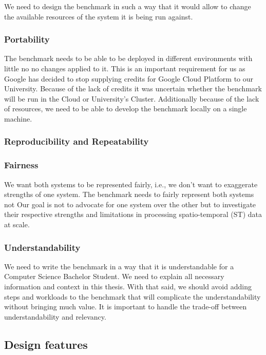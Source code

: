 We need to design the benchmark in such a way that it would allow to change the available resources of the system it is being run against.

\subsubsection{Portability}
\label{req:portability}

The benchmark needs to be able to be deployed in different environments with little no no changes applied to it.
This is an important requirement for us as Google has decided to stop supplying credits for Google Cloud Platform to our University.
Because of the lack of credits it was uncertain whether the benchmark will be run in the Cloud or University's Cluster.
Additionally because of the lack of resources, we need to be able to develop the benchmark locally on a single machine.

\subsubsection{Reproducibility and Repeatability}
\label{req:reproducibility-and-repeatability}

\subsubsection{Fairness}
\label{req:fairness}
We want both systems to be represented fairly, i.e., we don't want to exaggerate strengths of one system.
The benchmark needs to fairly represent both systems not 
Our goal is not to advocate for one system over the other but to investigate their respective strengths and limitations in processing spatio-temporal (ST) data at scale.


\subsubsection{Understandability}
\label{req:understandability}
We need to write the benchmark in a way that it is understandable for a Computer Science Bachelor Student.
We need to explain all necessary information and context in this thesis.
With that said, we should avoid adding steps and workloads to the benchmark that will complicate the understandability without bringing much value.
It is important to handle the trade-off between understandability and relevancy.


\subsection{Design features}

